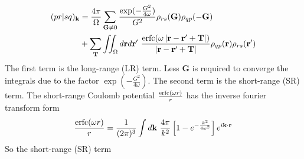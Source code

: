 \documentclass{article}
\begin{document}
            \begin{align}
                (pr|sq)_{\textbf{k}} &= \frac{4\pi}{\Omega}\sum_{\textbf{G}\neq 0}
                \frac{\exp(-\frac{G^2}{4\omega})}{G^2}\rho_{rs}(\textbf{G})\rho_{qp}(-\textbf{G})\notag\\
                &+ \sum_{\textbf{T}}\iint_{\Omega}d\textbf{r}d\textbf{r}'\ 
                \frac{{\rm erfc}(\omega\left|\textbf{r}-\textbf{r}'+\textbf{T}\right|)}{\left|\textbf{r}-\textbf{r}'+\textbf{T}\right|}
                \rho_{qp}(\textbf{r})\rho_{rs}(\textbf{r}')
            \end{align}
            The first term is the long-range (LR) term.
            Less $\textbf{G}$ is required to converge the integrals due to the factor $\exp(-\frac{G^2}{4\omega})$.
            The second term is the short-range (SR) term.
            The short-range Coulomb potential $\frac{{\rm erfc}(\omega r)}{r}$ has the inverse fourier transform form
            \begin{equation}
                \frac{{\rm erfc}(\omega r)}{r} = \frac{1}{(2\pi)^3}\int d\textbf{k}\ \frac{4\pi}{k^2}\left[1-e^{-\frac{k^2}{4\omega^2}}\right]e^{i\textbf{k}\cdot\textbf{r}}
            \end{equation}
            So the short-range (SR) term 
\end{document}
